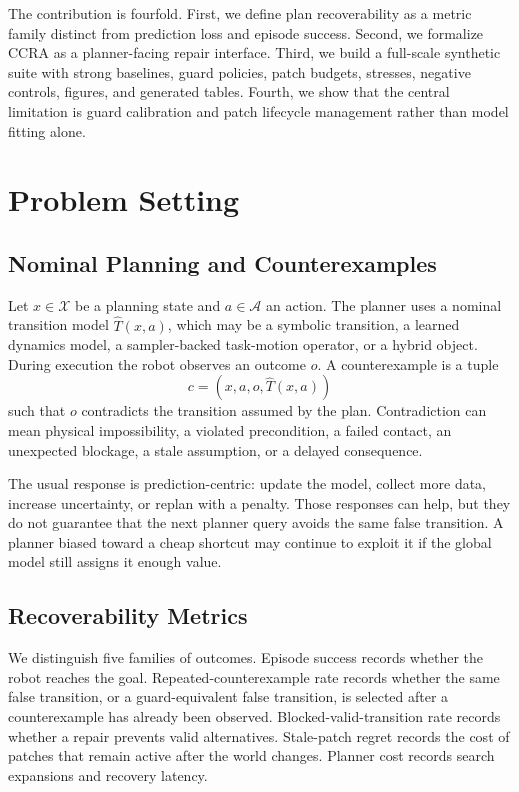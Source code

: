 \documentclass{article}
\newcommand{\ccra}{\textsc{CCRA}}
\newcommand{\model}{\hat{T}}
\begin{document}
The contribution is fourfold. First, we define plan recoverability as a metric
family distinct from prediction loss and episode success. Second, we formalize
\ccra{} as a planner-facing repair interface. Third, we build a full-scale
synthetic suite with strong baselines, guard policies, patch budgets, stresses,
negative controls, figures, and generated tables. Fourth, we show that the
central limitation is guard calibration and patch lifecycle management rather
than model fitting alone.

\section{Problem Setting}

\subsection{Nominal Planning and Counterexamples}

Let $x \in \mathcal{X}$ be a planning state and $a \in \mathcal{A}$ an action.
The planner uses a nominal transition model $\model(x,a)$, which may be a
symbolic transition, a learned dynamics model, a sampler-backed task-motion
operator, or a hybrid object. During execution the robot observes an outcome
$o$. A counterexample is a tuple
\begin{equation}
    c = (x, a, o, \model(x,a))
\end{equation}
such that $o$ contradicts the transition assumed by the plan. Contradiction can
mean physical impossibility, a violated precondition, a failed contact, an
unexpected blockage, a stale assumption, or a delayed consequence.

The usual response is prediction-centric: update the model, collect more data,
increase uncertainty, or replan with a penalty. Those responses can help, but
they do not guarantee that the next planner query avoids the same false
transition. A planner biased toward a cheap shortcut may continue to exploit it
if the global model still assigns it enough value.

\subsection{Recoverability Metrics}

We distinguish five families of outcomes. Episode success records whether the
robot reaches the goal. Repeated-counterexample rate records whether the same
false transition, or a guard-equivalent false transition, is selected after a
counterexample has already been observed. Blocked-valid-transition rate records
whether a repair prevents valid alternatives. Stale-patch regret records the
cost of patches that remain active after the world changes. Planner cost records
search expansions and recovery latency.
\end{document}
